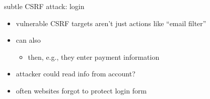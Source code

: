 \begin{frame}{subtle CSRF attack: login}
    \begin{itemize}
    \item vulnerable CSRF targets aren't just actions like ``email filter''
    \item can also 
        \begin{itemize}
        \item then, e.g., they enter payment information
        \end{itemize}
    \item attacker could read info from account?
    \item often websites forgot to protect login form
    \end{itemize}
\end{frame}
